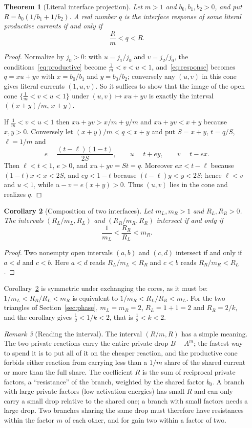 \documentclass[11pt,a4paper]{article}
\theoremstyle{plain}
\newtheorem{theorem}{Theorem}[section]
\newtheorem{corollary}[theorem]{Corollary}
\theoremstyle{definition}
\theoremstyle{remark}
\newtheorem{remark}[theorem]{Remark}
\begin{document}
\begin{theorem}[Literal interface projection]\label{thm:interface}
Let $m>1$ and $b_0,b_1,b_2>0$, and put $R=b_0(1/b_1+1/b_2)$. A real number $q$ is the interface response of some literal productive currents if and only if
\[
  \frac Rm<q<R .
\]
\end{theorem}

\begin{proof}
Normalize by $j_0>0$: with $u=j_1/j_0$ and $v=j_2/j_0$, the conditions~\eqref{eq:productive} become $\tfrac1m<v<u<1$, and~\eqref{eq:response} becomes $q=xu+yv$ with $x=b_0/b_1$ and $y=b_0/b_2$; conversely any $(u,v)$ in this cone gives literal currents $(1,u,v)$. So it suffices to show that the image of the open cone $\{\tfrac1m<v<u<1\}$ under $(u,v)\mapsto xu+yv$ is exactly the interval $((x+y)/m,\,x+y)$.

If $\tfrac1m<v<u<1$ then $xu+yv>x/m+y/m$ and $xu+yv<x+y$ because $x,y>0$. Conversely let $(x+y)/m<q<x+y$ and put $S=x+y$, $t=q/S$, $\ell=1/m$ and
\[
  e=\frac{(t-\ell)(1-t)}{2S},\qquad u=t+ey,\qquad v=t-ex .
\]
Then $\ell<t<1$, $e>0$, and $xu+yv=St=q$. Moreover $ex<t-\ell$ because $(1-t)x<x<2S$, and $ey<1-t$ because $(t-\ell)y<y<2S$; hence $\ell<v$ and $u<1$, while $u-v=e(x+y)>0$. Thus $(u,v)$ lies in the cone and realizes $q$.
\end{proof}

\begin{corollary}[Composition of two interfaces]\label{cor:compose}
Let $m_L,m_R>1$ and $R_L,R_R>0$. The intervals $(R_L/m_L,R_L)$ and $(R_R/m_R,R_R)$ intersect if and only if
\[
  \frac1{m_L}<\frac{R_R}{R_L}<m_R .
\]
\end{corollary}

\begin{proof}
Two nonempty open intervals $(a,b)$ and $(c,d)$ intersect if and only if $a<d$ and $c<b$. Here $a<d$ reads $R_L/m_L<R_R$ and $c<b$ reads $R_R/m_R<R_L$.
\end{proof}

Corollary~\ref{cor:compose} is symmetric under exchanging the cores, as it must be: $1/m_L<R_R/R_L<m_R$ is equivalent to $1/m_R<R_L/R_R<m_L$. For the two triangles of Section~\ref{sec:phase}, $m_L=m_R=2$, $R_L=1+1=2$ and $R_R=2/k$, and the corollary gives $\tfrac12<1/k<2$, that is $\tfrac12<k<2$.

\begin{remark}[Reading the interval]\label{rem:interval}
The interval $(R/m,R)$ has a simple meaning. The two private reactions carry the entire private drop $B-A^m$; the fastest way to spend it is to put all of it on the cheaper reaction, and the productive cone forbids either reaction from carrying less than a $1/m$ share of the shared current or more than the full share. The coefficient $R$ is the sum of reciprocal private factors, a ``resistance'' of the branch, weighted by the shared factor $b_0$. A branch with large private factors (low activation energies) has small $R$ and can only carry a small drop relative to the shared one; a branch with small factors needs a large drop. Two branches sharing the same drop must therefore have resistances within the factor $m$ of each other, and for gain two within a factor of two.
\end{remark}
\end{document}
